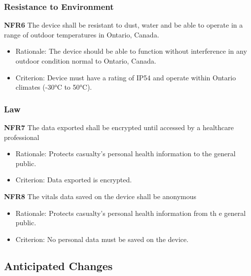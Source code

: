 \documentclass{article}
\begin{document}
	\subsubsection{Resistance to Environment}
	\textbf{NFR6} The device shall be resistant to dust, water and be able to operate in a range of outdoor temperatures in Ontario, Canada. 
    \begin{itemize}
	    \item Rationale: The device should be able to function without interference in any outdoor condition normal to Ontario, Canada.
	    \item Criterion: Device must have a rating of IP54 and operate within Ontario climates (-30°C to 50°C).  
	\end{itemize}
	
	\subsubsection{Law}
	\textbf{NFR7} The data exported shall be encrypted until accessed by a healthcare professional
	\begin{itemize}
		\item Rationale: Protects casualty's personal health information to the general public.
	    \item Criterion: Data exported is encrypted.
	\end{itemize}
	
	\noindent	
	\textbf{NFR8} The vitals data saved on the device shall be anonymous
	\begin{itemize}
		\item Rationale: Protects casualty's personal health information from th e general public.
	    \item Criterion: No personal data must be saved on the device.
	\end{itemize}	
	
	\subsection{Anticipated Changes}
\end{document}
